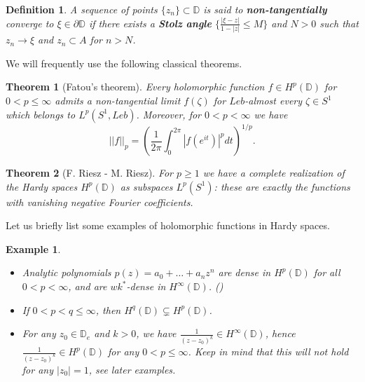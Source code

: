 \documentclass[11pt]{article}
\newtheorem{definition}{Definition}[section]
\newtheorem{theorem}{Theorem}[section]
\newtheorem{example}{Example}[section]
\begin{document}
\begin{definition}
	\label{D:non-tangential convergence}
	A sequence of points $\{z_n\} \subset \mathbb{D}$ is said to \textbf{non-tangentially} converge to $\xi \in \partial \mathbb{D}$ if there exists a \textbf{Stolz angle} $\{ \frac{|\xi - z|}{1 - |z|} \le M \}$ and $N > 0$ such that $z_n \rightarrow \xi$ and $z_n \subset A$ for $n > N$.
\end{definition}

We will frequently use the following classical theorems.

\begin{theorem}[Fatou's theorem]
	\label{T: Fatou theorem}
	Every holomorphic function $f \in H^p(\mathbb{D})$ for $0 < p \le \infty$ admits a non-tangential limit $f(\zeta)$ for $Leb$-almost every $\zeta \in S^1$ which belongs to $L^p(S^1, Leb)$. Moreover, for $0 < p < \infty$ we have
	\[
	||f||_p = \left( \frac{1}{2 \pi} \int_{0}^{2 \pi} |f(e^{i t})|^p dt\right)^{1/p} .
	\]
\end{theorem}

\begin{theorem}[F. Riesz - M. Riesz]
	\label{T: Riesz-Riesz theorem}
		For $p \ge 1$ we have a complete realization of the Hardy spaces $H^p(\mathbb{D})$ as subspaces $L^p(S^1)$: these are exactly the functions with vanishing negative Fourier coefficients.
\end{theorem}

Let us briefly list some examples of holomorphic functions in Hardy spaces.

\begin{example}
	\indent
	\begin{itemize}
		\item Analytic polynomials $p(z) = a_0 + \dots + a_n z^n$ are dense in $H^p(\mathbb{D})$ for all $0 < p < \infty$, and are $wk^*$-dense in $H^\infty(\mathbb{D})$. (\cite[Theorem 1.9.4]{book:738388})
		\item If $0 < p < q \le \infty$, then $H^q(\mathbb{D}) \subsetneq H^p(\mathbb{D})$.
		\item For any $z_0 \in \mathbb{D}_e$ and $k > 0$, we have $\frac{1}{(z - z_0)^k} \in H^\infty(\mathbb{D})$, hence $\frac{1}{(z - z_0)^k} \in H^p(\mathbb{D})$ for any $0 < p \le \infty$. Keep in mind that this will not hold for any $|z_0| = 1$, see later examples.
	\end{itemize}
\end{example}
\end{document}
